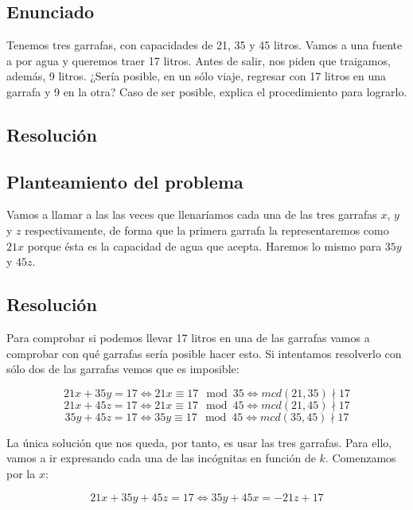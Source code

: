 \section{}\label{ej-1-1}

\subsection*{Enunciado}

Tenemos tres garrafas, con capacidades de 21, 35 y 45 litros.
Vamos a una fuente a por agua y queremos traer 17 litros.
Antes de salir, nos piden que traigamos, además, 9 litros.
¿Sería posible, en un sólo viaje, regresar con 17 litros en una garrafa y 9 en la otra?
Caso de ser posible, explica el procedimiento para lograrlo.

\subsection*{Resolución}

\subsection*{Planteamiento del problema}

Vamos a llamar a las las veces que llenaríamos cada una de las tres garrafas $x$, $y$ y $z$ respectivamente, de forma que la primera garrafa la representaremos como $21x$ porque ésta es la capacidad de agua que acepta.
Haremos lo mismo para $35y$ y $45z$.

\subsection*{Resolución}

Para comprobar si podemos llevar 17 litros en una de las garrafas vamos a comprobar con qué garrafas sería posible hacer esto.
Si intentamos resolverlo con sólo dos de las garrafas vemos que es imposible:

\[21x + 35y = 17 \iff 21x \equiv 17 \mod 35 \iff mcd(21,35)\nmid17\]
\[21x + 45z = 17 \iff 21x \equiv 17 \mod 45 \iff mcd(21,45)\nmid17\]
\[35y + 45z = 17 \iff 35y \equiv 17 \mod 45 \iff mcd(35,45)\nmid17\]

La única solución que nos queda, por tanto, es usar las tres garrafas.
Para ello, vamos a ir expresando cada una de las incógnitas en función de $k$.
Comenzamos por la $x$:

\[21x + 35y + 45z = 17 \iff 35y + 45x = -21z + 17\]

